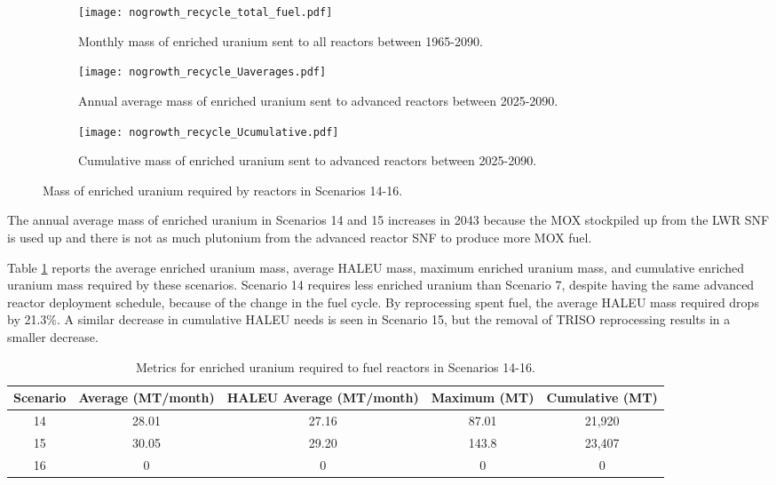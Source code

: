 \begin{figure}[h!]
    \centering
    \begin{subfigure}[b]{0.45\textwidth}
        \centering
        \texttt{[image: nogrowth\_recycle\_total\_fuel.pdf]}
        \caption{Monthly mass of enriched uranium sent to all reactors 
        between 1965-2090.}
        \label{fig:nogrowth_recycle_all_uranium}
    \end{subfigure}
    \hfill
    \begin{subfigure}[b]{0.45\textwidth}
        \centering
        \texttt{[image: nogrowth\_recycle\_Uaverages.pdf]}
        \caption{Annual average mass of enriched uranium sent to 
        advanced reactors between 2025-2090.}
        \label{fig:nogrowth_recycle_AR_uranium}
    \end{subfigure}
    \begin{subfigure}[b]{0.45\textwidth}
        \centering
        \texttt{[image: nogrowth\_recycle\_Ucumulative.pdf]}
        \caption{Cumulative mass of enriched 
        uranium sent to advanced reactors between 2025-2090.}
        \label{fig:nogrowth_recycle_uranium_cumulative}
    \end{subfigure}
       \caption{Mass of enriched uranium required by reactors
        in Scenarios 14-16.}
       \label{fig:nogrowth_recycle_uranium}
\end{figure}

The annual average mass of enriched uranium in Scenarios 14 and 15 increases 
in 2043 because the \gls{MOX} stockpiled up from the \gls{LWR} \gls{SNF} 
is used up and there is not as much plutonium from the advanced reactor 
\gls{SNF} to produce more \gls{MOX} fuel. 

Table \ref{tab:s14-16_uranium} reports the average enriched uranium mass, 
average \gls{HALEU} mass, maximum enriched uranium mass, and cumulative 
enriched uranium mass required by these scenarios. Scenario 14 requires 
less enriched uranium than Scenario 7, despite having the same 
advanced reactor deployment schedule, because of the change in the 
fuel cycle. By reprocessing spent fuel, the average \gls{HALEU} 
mass required drops by 21.3\%. A similar decrease in cumulative 
\gls{HALEU} needs is seen in Scenario 15, but the removal of 
\gls{TRISO} reprocessing  results in a smaller decrease. 

\begin{table}[h!]
    \centering 
    \caption{Metrics for enriched uranium required to fuel reactors 
    in Scenarios 14-16.}
    \label{tab:s14-16_uranium}
    \begin{tabular}{c c c c c}
        \hline 
        Scenario & Average (MT/month) & HALEU Average (MT/month) 
        & Maximum (MT) & Cumulative (MT) \\
        \hline 
        14 & 28.01 & 27.16 & 87.01 & 21,920 \\
        15 & 30.05 & 29.20 & 143.8 & 23,407\\
        16 & 0 & 0 & 0 & 0\\
        \hline
        
    \end{tabular}
\end{table}

